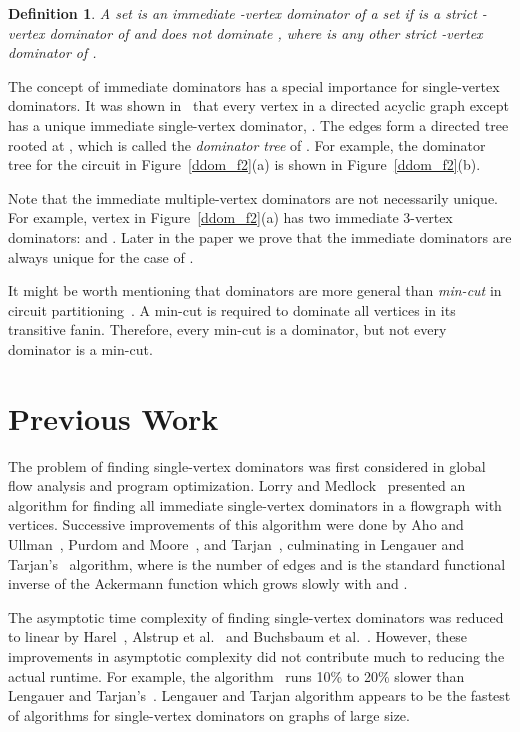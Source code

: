 \documentclass{llncs}
\newtheorem{defn}{Definition}
\begin{document}
\begin{defn} \label{ddom_idom}
A set  is an {\em immediate} -vertex dominator of a set  if  is
a strict -vertex dominator of  and  does not dominate , where  is
any other strict -vertex dominator of .
\end{defn}

The concept of immediate dominators has a special importance for
single-vertex dominators. It was shown
in~\cite{LoM69,AhU72} that every vertex  in a directed acyclic graph  except  has a
unique immediate single-vertex dominator, .
The edges  form a directed
tree rooted at , which is called the {\em dominator tree} of
. For example, the dominator tree for the circuit  in Figure~\ref{ddom_f2}(a) is shown in Figure~\ref{ddom_f2}(b).

Note that the immediate multiple-vertex dominators are not necessarily unique.
For example, vertex  in Figure~\ref{ddom_f2}(a) has two immediate 3-vertex dominators:  and .
Later in the paper we prove that the immediate dominators 
are always unique for the case of .

It might be worth mentioning that dominators are more general than
{\em min-cut} in circuit partitioning~\cite{KeL70}. A min-cut is
required to dominate all vertices in its transitive fanin. Therefore, every
min-cut is a dominator, but not every dominator is a min-cut.

\section{Previous Work} \label{ddom_prev}

The problem of finding single-vertex dominators was first considered
in global flow analysis and program optimization. Lorry and
Medlock~\cite{LoM69} presented an  algorithm for finding
all immediate single-vertex dominators in
a flowgraph with  vertices.
Successive improvements of this algorithm were done
by Aho and Ullman~\cite{AhU72}, Purdom and Moore~\cite{PuM72}, and
Tarjan~\cite{Ta74}, culminating in Lengauer and Tarjan's~\cite{LeT79}
 algorithm, where  is the number of edges and
 is the standard functional inverse of the Ackermann function
which grows slowly with  and .

The asymptotic time complexity of finding single-vertex dominators was
reduced to linear by Harel~\cite{Ha85}, Alstrup et al.~\cite{AlHLT99}
and Buchsbaum et al.~\cite{BuKRW98}. However, these improvements in
asymptotic complexity did not contribute much to reducing the actual
runtime. For example, the algorithm~\cite{BuKRW98} runs 10\% to 20\%
slower than Lengauer and Tarjan's~\cite{LeT79}. Lengauer and Tarjan
algorithm appears to be the fastest of algorithms for single-vertex
dominators on graphs of large size.
\end{document}
